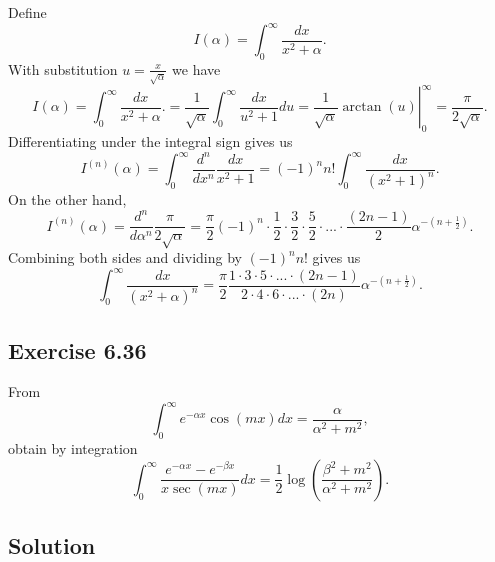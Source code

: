 Define
\begin{equation*}
    I(\alpha) = \int_0^{\infty} \frac{dx}{x^2 + \alpha}.
\end{equation*}
With substitution $u = \frac{x}{\sqrt{\alpha}}$ we have
\begin{equation*}
    I(\alpha) = \int_0^{\infty} \frac{dx}{x^2 + \alpha}.
        = \frac{1}{\sqrt{\alpha}} \int_0^{\infty} \frac{dx}{u^2 + 1} du
        = \left. \frac{1}{\sqrt{\alpha}} \arctan(u) \right|_0^{\infty}
        = \frac{\pi}{2 \sqrt{\alpha}}.
\end{equation*}
Differentiating under the integral sign gives us
\begin{equation*}
    I^{(n)}(\alpha) = \int_0^{\infty} \frac{d^n}{dx^n} \frac{dx}{x^2 + 1}
        = (-1)^n n! \int_0^{\infty} \frac{dx}{(x^2 + 1)^n}.
\end{equation*}
On the other hand,
\begin{equation*}
    I^{(n)}(\alpha) = \frac{d^n}{d\alpha^n} \frac{\pi}{2 \sqrt{\alpha}}
        = \frac{\pi}{2} (-1)^n \cdot \frac{1}{2} \cdot \frac{3}{2} \cdot \frac{5}{2} \cdot ... \cdot \frac{(2n-1)}{2} \alpha^{-(n + \frac{1}{2})}.
\end{equation*}
Combining both sides and dividing by $(-1)^n n!$ gives us
\begin{equation*}
    \int_0^{\infty} \frac{dx}{(x^2 + \alpha)^n} = \frac{\pi}{2} \frac{1 \cdot 3 \cdot 5 \cdot ... \cdot (2n - 1)}{2 \cdot 4 \cdot 6 \cdot ... \cdot (2n)} \alpha^{-(n + \frac{1}{2})}.
\end{equation*}


\subsection*{Exercise 6.36}

From
\begin{equation*}
    \int_0^{\infty} e^{-\alpha x} \cos(mx) dx = \frac{\alpha}{\alpha^2 + m^2},
\end{equation*}
obtain by integration
\begin{equation*}
    \int_0^{\infty} \frac{e^{-\alpha x} - e^{-\beta x}}{x \sec(mx)} dx = \frac{1}{2} \log\left( \frac{\beta^2 + m^2}{\alpha^2 + m^2} \right).
\end{equation*}

\subsection*{Solution}

